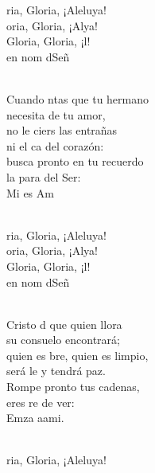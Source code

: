 \begin{cancion}%
	\begin{chorus}%
	ria, Gloria, ¡Aleluya!\\
	oria, Gloria, ¡Alya!\\
	Gloria, Gloria, ¡l!\\
	en nom dSeñ \\
	\end{chorus}%
	\jump\\
	Cuando ntas que tu hermano\\
necesita de tu amor,\\
	no le ciers las entrañas\\
	ni el ca del corazón:\\
busca pronto en tu recuerdo\\
	la para del Ser:\\
	Mi  es  Am\\\jump\\
	\begin{chorus}%
	ria, Gloria, ¡Aleluya!\\
	oria, Gloria, ¡Alya!\\
	Gloria, Gloria, ¡l!\\
	en nom dSeñ \\
	\end{chorus}%
	\jump\\
	Cristo d que quien llora\\
su consuelo encontrará;\\
	quien es bre, quien es limpio,\\
	será le y tendrá paz.\\
Rompe pronto tus cadenas,\\
	eres re de ver:\\
	Emza aami.\\\jump\\
	\begin{chorus}%
	ria, Gloria, ¡Aleluya!\\

\end{chorus}
\end{cancion}
